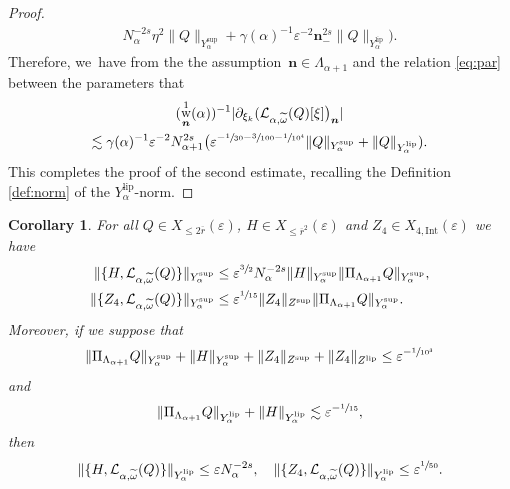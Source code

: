 \documentclass[JEP,XML,SOM,Unicode,published]{cedram}
\DeclareMathOperator{\rw}{w}
\theoremstyle{plain}
\newtheorem{corollary}[theorem]{Corollary}
\theoremstyle{definition}
\newcommand{\nb}{{\boldsymbol n}}
\newcommand{\1}{\mathbf{1}}
\newcommand{\Ysup}[1]{Y_{#1}^{\mathrm{sup}}}
\newcommand{\Ylip}[1]{Y_{#1}^{\mathrm{lip}}}
\let\epsilon\varepsilon
\begin{document}
\begin{proof}
\begin{align*}
N_{\alpha}^{-2s}\eta^{2}\|Q\|_{\Ysup{\alpha}}
+
\gamma(\alpha)^{-1}\epsilon^{-2}\nb_{-}^{2s}
\|Q\|_{\Ylip{\alpha}}
\Big).
\end{align*}
Therefore, we~have from the the assumption~$\nb\in\Lambda_{\alpha+1}$ and the relation \eqref{eq:par} between the parameters that
\begin{multline*}
(\rw_{\nb}^{1}(\alpha))^{-1}
|
\partial_{\xi_{k}}
(
\mathcal{L}_{\alpha,\widetilde{\omega}}(Q)[\xi]
\bigr)_{\nb}
|\\
\lesssim \gamma(\alpha)^{-1}\epsilon^{-2}N_{\alpha+1}^{2s}\bigl(
\epsilon^{-\sfrac{1}{30}-\sfrac{3}{100}-\sfrac{1}{10^{4}}}
\|Q\|_{\Ysup{\alpha}}
+
\|Q\|_{\Ylip{\alpha}}
).
\end{multline*}
This completes the proof of the second estimate, recalling the Definition \ref{def:norm} of the $\Ylip{\alpha}$-norm.
\end{proof}
\begin{corollary}
\label{cor:ad}
For all $Q\in X_{\leq2\overline{r}}(\epsilon)$, $H\in X_{\leq\overline{r}^{2}}(\epsilon)$ and $Z_{4}\in X_{4,\mathrm{Int}}(\epsilon)$ we have
\begin{align*}
\|\{H,\mathcal{L}_{\alpha,\widetilde{\omega}}(Q)\}\|_{\Ysup{\alpha}}
&\leq \epsilon^{\sfrac{3}{2}}N_{\alpha}^{-2s}
\|H\|_{\Ysup{\alpha}}
\|\Pi_{\Lambda_{\alpha+1}}Q\|_{\Ysup{\alpha}},\\
\|\{Z_{4},\mathcal{L}_{\alpha,\widetilde{\omega}}(Q)\}\|_{\Ysup{\alpha}}
&\leq \epsilon^{\sfrac{1}{15}}
\|Z_{4}\|_{Z^{\mathrm{sup}}}
\|\Pi_{\Lambda_{\alpha+1}}Q\|_{\Ysup{\alpha}}.
\end{align*}
Moreover, if we suppose that
\begin{equation}
\label{eq:as-14}
\|\Pi_{\Lambda_{\alpha+1}}Q\|_{\Ysup{\alpha}}
+\|H\|_{\Ysup{\alpha}}
+\|Z_{4}\|_{Z^{\mathrm{sup}}}
+
\|Z_{4}\|_{Z^{\mathrm{lip}}}
\leq \epsilon^{-\sfrac{1}{10^{3}}}
\end{equation}
and
\begin{equation}
\label{eq:as-15}
\|\Pi_{\Lambda_{\alpha+1}}Q\|_{\Ylip{\alpha}}+\|H\|_{\Ylip{\alpha}}\lesssim \epsilon^{-\sfrac{1}{15}},
\end{equation}
then
\[
\|\{H,\mathcal{L}_{\alpha,\widetilde{\omega}}(Q)\}\|_{\Ylip{\alpha}}
\leq \epsilon N_{\alpha}^{-2s},\quad
\|\{Z_{4},\mathcal{L}_{\alpha,\widetilde{\omega}}(Q)\}\|_{\Ylip{\alpha}}
\leq \epsilon^{\sfrac{1}{50}}.
\]
\end{corollary}
\end{document}
